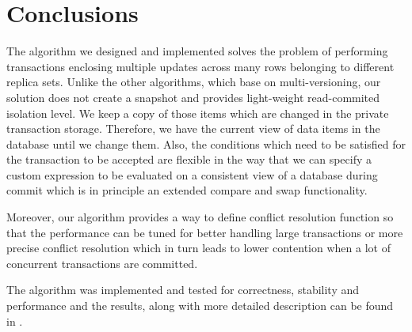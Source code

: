 \documentclass[runningheads,a4paper]{llncs}
\begin{document}
\section{Conclusions}

The algorithm we designed and implemented solves the problem of performing transactions enclosing multiple updates across many rows belonging to different replica sets. Unlike the other algorithms, which base on multi-versioning, our solution does not create a snapshot and provides light-weight read-commited isolation level. We keep a copy of those items which are changed in the private transaction storage. Therefore, we have the current view of data items in the database until we change them. Also, the conditions which need to be satisfied for the transaction to be accepted are flexible in the way that we can specify a custom expression to be evaluated on a consistent view of a database during commit which is in principle an extended compare and swap functionality. 

Moreover, our algorithm provides a way to define conflict resolution function so that the performance can be tuned for better handling large transactions or more precise conflict resolution which in turn leads to lower contention when a lot of concurrent transactions are committed. 

The algorithm was implemented and tested for correctness, stability and performance and the results, along with more detailed description can be found in \cite{masterthesis}.

\pagebreak


 
\end{document}
